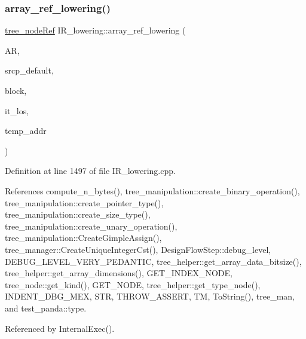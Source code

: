 \subsubsection{\texorpdfstring{array\+\_\+ref\+\_\+lowering()}{array\_ref\_lowering()}}
{\footnotesize\ttfamily \hyperlink{tree__node_8hpp_a6ee377554d1c4871ad66a337eaa67fd5}{tree\+\_\+node\+Ref} I\+R\+\_\+lowering\+::array\+\_\+ref\+\_\+lowering (\begin{DoxyParamCaption}\item[{array\+\_\+ref $\ast$}]{AR,  }\item[{const std\+::string \&}]{srcp\+\_\+default,  }\item[{std\+::pair$<$ unsigned int, bloc\+Ref $>$}]{block,  }\item[{std\+::list$<$ \hyperlink{tree__node_8hpp_a6ee377554d1c4871ad66a337eaa67fd5}{tree\+\_\+node\+Ref} $>$\+::const\+\_\+iterator}]{it\+\_\+los,  }\item[{bool}]{temp\+\_\+addr }\end{DoxyParamCaption})\hspace{0.3cm}{\ttfamily [private]}}



Definition at line 1497 of file I\+R\+\_\+lowering.\+cpp.



References compute\+\_\+n\+\_\+bytes(), tree\+\_\+manipulation\+::create\+\_\+binary\+\_\+operation(), tree\+\_\+manipulation\+::create\+\_\+pointer\+\_\+type(), tree\+\_\+manipulation\+::create\+\_\+size\+\_\+type(), tree\+\_\+manipulation\+::create\+\_\+unary\+\_\+operation(), tree\+\_\+manipulation\+::\+Create\+Gimple\+Assign(), tree\+\_\+manager\+::\+Create\+Unique\+Integer\+Cst(), Design\+Flow\+Step\+::debug\+\_\+level, D\+E\+B\+U\+G\+\_\+\+L\+E\+V\+E\+L\+\_\+\+V\+E\+R\+Y\+\_\+\+P\+E\+D\+A\+N\+T\+IC, tree\+\_\+helper\+::get\+\_\+array\+\_\+data\+\_\+bitsize(), tree\+\_\+helper\+::get\+\_\+array\+\_\+dimensions(), G\+E\+T\+\_\+\+I\+N\+D\+E\+X\+\_\+\+N\+O\+DE, tree\+\_\+node\+::get\+\_\+kind(), G\+E\+T\+\_\+\+N\+O\+DE, tree\+\_\+helper\+::get\+\_\+type\+\_\+node(), I\+N\+D\+E\+N\+T\+\_\+\+D\+B\+G\+\_\+\+M\+EX, S\+TR, T\+H\+R\+O\+W\+\_\+\+A\+S\+S\+E\+RT, TM, To\+String(), tree\+\_\+man, and test\+\_\+panda\+::type.



Referenced by Internal\+Exec().

